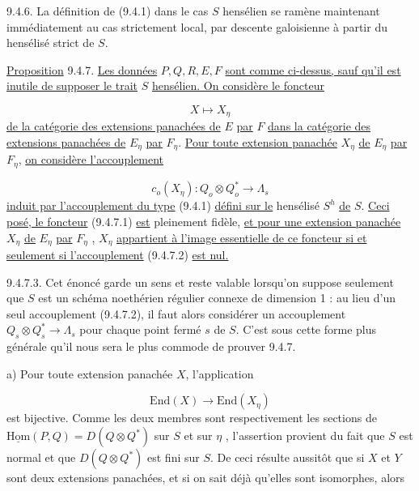 9.4.6. La définition de (9.4.1) dans le cas $S$ hensélien se ramène maintenant immédiatement au cas strictement local, par descente galoisienne à partir du hensélisé strict de $S$.

\underline{Proposition} 9.4.7. \underline{Les données} $P,Q,R,E,F$ \underline{sont comme ci-dessus, sauf qu'il est inutile de supposer le trait} $S$ \underline{hensélien. On considère le foncteur}

\begin{equation}\tag{9.4.7.1}
X \longmapsto X_\eta
\end{equation}
\underline{de la catégorie des extensions panachées de} $E$ \underline{par} $F$ \underline{dans la catégorie des extensions panachées de} $E_\eta$ \underline{par} $F_\eta$. \underline{Pour toute extension panachée} $X_\eta$ \underline{de} $E_\eta$ \underline{par} $F_\eta$, \underline{on considère l'accouplement}

\begin{equation}\tag{9.4.7.2}
c_o(X_\eta) : Q_o \otimes Q_o^* \longrightarrow \Lambda_s
\end{equation}
\underline{induit par l'accouplement du type} (9.4.1) \underline{défini sur le} hensélisé $S^h$ \underline{de} $S$. \underline{Ceci posé, le foncteur} (9.4.7.1) \underline{est} pleinement fidèle, \underline{et pour une extension panachée} $X_\eta$ \underline{de} $E_\eta$ \underline{par} $F_\eta$ , $X_\eta$ \underline{appartient à l'image essentielle de ce foncteur si et seulement si l'accouplement} (9.4.7.2) \underline{est nul.}



9.4.7.3.  Cet énoncé garde un sens et reste valable lorsqu'on suppose seulement que $S$ est un schéma noethérien régulier connexe de dimension 1 : au lieu d'un seul accouplement (9.4.7.2), il faut alors considérer un accouplement $Q_s \otimes Q_s^* \longrightarrow \Lambda_s$ pour chaque point fermé $s$ de $S$. C'est sous cette forme plus générale qu'il nous sera le plus commode de prouver 9.4.7.

a)  Pour toute extension panachée $X$, l'application

\begin{equation*}
\mathrm{End}(X) \longrightarrow \mathrm{End}(X_\eta)
\end{equation*}
est bijective. Comme les deux membres sont respectivement les sections de $\underline{\mathrm{Hom}}(P,Q) = D(Q \otimes Q^*)$ sur $S$ et sur $\eta$ , l'assertion provient du fait que $S$ est normal et que $D(Q \otimes Q^*)$ est fini sur $S$. De ceci résulte aussitôt que si $X$ et $Y$ sont deux extensions panachées, et si on sait déjà qu'elles sont isomorphes, alors

